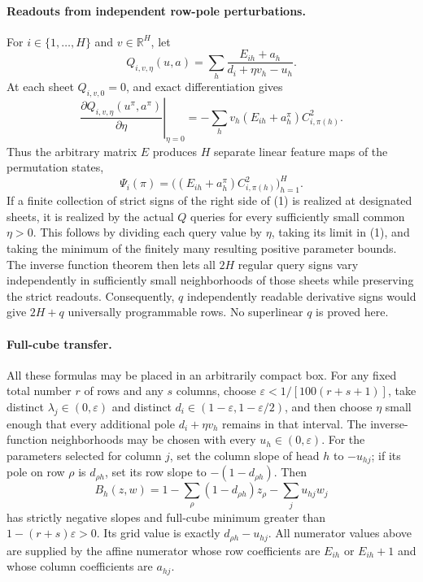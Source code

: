 \documentclass[11pt]{article}
\begin{document}
\paragraph{Readouts from independent row-pole perturbations.}
For $i\in\{1,\ldots,H\}$ and $v\in\mathbb R^H$, let
\[
 Q_{i,v,\eta}(u,a)=
       \sum_h\frac{E_{ih}+a_h}{d_i+\eta v_h-u_h}.
\]
At each sheet $Q_{i,v,0}=0$, and exact differentiation gives
\[
 \left.\frac{\partial Q_{i,v,\eta}(u^\pi,a^\pi)}{\partial\eta}
       \right|_{\eta=0}
 =-\sum_hv_h(E_{ih}+a_h^\pi)C_{i,\pi(h)}^2.
 \tag{1}
\]
Thus the arbitrary matrix $E$ produces $H$ separate linear feature
maps of the permutation states,
\[
 \Psi_i(\pi)=\bigl((E_{ih}+a_h^\pi)C_{i,\pi(h)}^2\bigr)_{h=1}^H.
\]
If a finite collection of strict signs of the right side of (1)
is realized at designated sheets, it is realized by the actual
$Q$ queries for every sufficiently small common $\eta>0$.
This follows by dividing each query value by $\eta$, taking its
limit in (1), and taking the minimum of the finitely many resulting
positive parameter bounds. The inverse function theorem then lets
all $2H$ regular query signs vary independently in sufficiently small
neighborhoods of those sheets while preserving the strict readouts.
Consequently, $q$ independently readable derivative signs would give
$2H+q$ universally programmable rows. No superlinear $q$ is proved here.

\paragraph{Full-cube transfer.}
All these formulas may be placed in an arbitrarily compact box.
For any fixed total number $r$ of rows and any $s$ columns, choose
$\varepsilon<1/[100(r+s+1)]$, take distinct
$\lambda_j\in(0,\varepsilon)$ and distinct
$d_i\in(1-\varepsilon,1-\varepsilon/2)$, and then choose $\eta$
small enough that every additional pole $d_i+\eta v_h$ remains in
that interval. The inverse-function neighborhoods may be chosen with
every $u_h\in(0,\varepsilon)$.
For the parameters selected for column $j$, set the column slope of
head $h$ to $-u_{hj}$; if its pole on row $\rho$ is $d_{\rho h}$,
set its row slope to $-(1-d_{\rho h})$. Then
\[
 B_h(z,w)=1-\sum_\rho(1-d_{\rho h})z_\rho
                    -\sum_j u_{hj}w_j
\]
has strictly negative slopes and full-cube minimum greater than
$1-(r+s)\varepsilon>0$. Its grid value is exactly
$d_{\rho h}-u_{hj}$. All numerator values above are supplied by
the affine numerator whose row coefficients are $E_{ih}$ or
$E_{ih}+1$ and whose column coefficients are $a_{hj}$.
\end{document}
